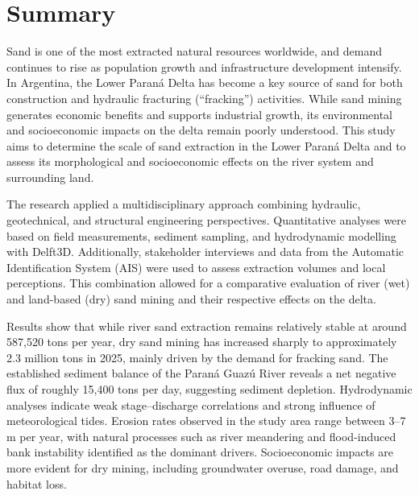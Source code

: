 \chapter*{Summary}
Sand is one of the most extracted natural resources worldwide, and demand continues to rise as population growth and infrastructure development intensify. In Argentina, the Lower Paraná Delta has become a key source of sand for both construction and hydraulic fracturing (“fracking”) activities. While sand mining generates economic benefits and supports industrial growth, its environmental and socioeconomic impacts on the delta remain poorly understood. This study aims to determine the scale of sand extraction in the Lower Paraná Delta and to assess its morphological and socioeconomic effects on the river system and surrounding land.

The research applied a multidisciplinary approach combining hydraulic, geotechnical, and structural engineering perspectives. Quantitative analyses were based on field measurements, sediment sampling, and hydrodynamic modelling with Delft3D. Additionally, stakeholder interviews and data from the Automatic Identification System (AIS) were used to assess extraction volumes and local perceptions. This combination allowed for a comparative evaluation of river (wet) and land-based (dry) sand mining and their respective effects on the delta.

Results show that while river sand extraction remains relatively stable at around 587,520 tons per year, dry sand mining has increased sharply to approximately 2.3 million tons in 2025, mainly driven by the demand for fracking sand. The established sediment balance of the Paraná Guazú River reveals a net negative flux of roughly 15,400 tons per day, suggesting sediment depletion. Hydrodynamic analyses indicate weak stage–discharge correlations and strong influence of meteorological tides. Erosion rates observed in the study area range between 3–7 m per year, with natural processes such as river meandering and flood-induced bank instability identified as the dominant drivers. Socioeconomic impacts are more evident for dry mining, including groundwater overuse, road damage, and habitat loss.